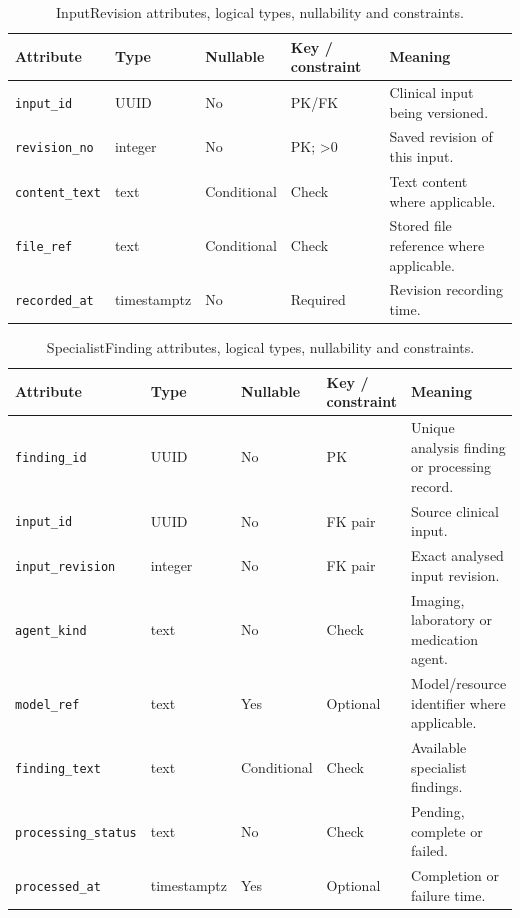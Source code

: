 \begin{table}[htbp]
\setlength{\tabcolsep}{5pt}
\centering
\small
\caption{InputRevision attributes, logical types, nullability and constraints.}
\label{tab:kashaf:dict-inputrevision}
\begin{tabular}{|p{}|p{}|p{}|p{}|p{}|}
\hline
Attribute & Type & Nullable & Key / constraint & Meaning \\ \hline
\texttt{input\_id} & UUID & No & PK/FK & Clinical input being versioned. \\ \hline
\texttt{revision\_no} & integer & No & PK; >0 & Saved revision of this input. \\ \hline
\texttt{content\_text} & text & Conditional & Check & Text content where applicable. \\ \hline
\texttt{file\_ref} & text & Conditional & Check & Stored file reference where applicable. \\ \hline
\texttt{recorded\_at} & timestamptz & No & Required & Revision recording time. \\ \hline
\end{tabular}
\end{table}

\begin{table}[htbp]
\setlength{\tabcolsep}{5pt}
\centering
\small
\caption{SpecialistFinding attributes, logical types, nullability and constraints.}
\label{tab:kashaf:dict-specialistfinding}
\begin{tabular}{|p{}|p{}|p{}|p{}|p{}|}
\hline
Attribute & Type & Nullable & Key / constraint & Meaning \\ \hline
\texttt{finding\_id} & UUID & No & PK & Unique analysis finding or processing record. \\ \hline
\texttt{input\_id} & UUID & No & FK pair & Source clinical input. \\ \hline
\texttt{input\_revision} & integer & No & FK pair & Exact analysed input revision. \\ \hline
\texttt{agent\_kind} & text & No & Check & Imaging, laboratory or medication agent. \\ \hline
\texttt{model\_ref} & text & Yes & Optional & Model/resource identifier where applicable. \\ \hline
\texttt{finding\_text} & text & Conditional & Check & Available specialist findings. \\ \hline
\texttt{processing\_status} & text & No & Check & Pending, complete or failed. \\ \hline
\texttt{processed\_at} & timestamptz & Yes & Optional & Completion or failure time. \\ \hline
\end{tabular}
\end{table}

